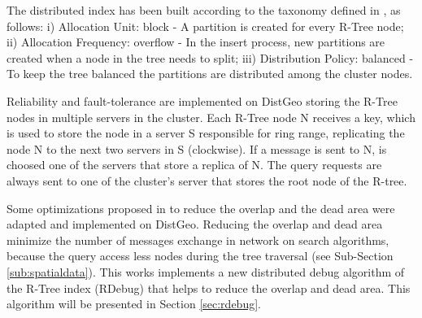 The distributed index has been built according to the taxonomy defined in \cite{an1999storing}, as follows: i) Allocation Unit: block - A partition is created for every R-Tree node; 
ii) Allocation Frequency: overflow - In the insert process, new partitions are created when a node in the tree needs to split; 
iii) Distribution Policy: balanced - To keep the tree balanced the partitions are distributed among the cluster nodes.
	
Reliability and fault-tolerance are implemented on DistGeo storing the R-Tree nodes in multiple servers in the cluster. 
Each R-Tree node N receives a key, which is used to store the node in a server S responsible for ring range, replicating the node N to the next two servers in S (clockwise). 
If a message is sent to N, is choosed one of the servers that store a replica of N.
The query requests are always sent to one of the cluster's server that stores the root node of the R-tree. 

Some optimizations proposed in \cite{beckmann1990r} to reduce the overlap and the dead area were adapted and implemented on DistGeo. 
Reducing the overlap and dead area minimize the number of messages exchange in network on search algorithms, because the query access less nodes during the tree traversal (see Sub-Section \ref{sub:spatialdata}). 
This works implements a new distributed debug algorithm of the R-Tree index (RDebug) that helps to reduce the overlap and dead area. This algorithm will be presented in Section \ref{sec:rdebug}.